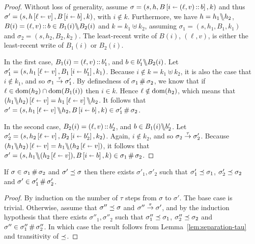 \documentclass[11pt]{report}
\begin{document}
\begin{proof}
	Without loss of generality, assume $\sigma = (s,h,B \left[ i \shortleftarrow (\ell,v)\operatorname{:\!:} b \right],k)$ and thus $\sigma' = (s,h \left[ \ell \shortleftarrow v \right],B \left[ i \shortleftarrow b \right],k)$, with $i \notin k$. Furthermore, we have $h = h_1 \backslash\!\!\backslash h_2$, $B(i) = (\ell,v) \operatorname{:\!:} b \in B_1(i) \backslash\!\!\backslash B_2(i)$ and $k = k_1 \uplus k_2$, assuming $\sigma_1 = (s,h_1,B_1,k_1)$ and $\sigma_2 = (s,h_2,B_2,k_2)$. The least-recent write of $B(i)$, $(\ell,v)$, is either the least-recent write of $B_1(i)$ or $B_2(i)$. 

	In the first case, $B_1(i) = (\ell,v) \operatorname{:\!:} b_1'$, and $b \in b'_1 \backslash\!\!\backslash B_2(i)$. Let $\sigma'_1 = (s,h_1 \left[ \ell \shortleftarrow v \right],B_1 \left[ i \shortleftarrow b'_1 \right],k_1)$. Because $i \notin k = k_1 \uplus k_2$, it is also the case that $i \notin k_1$, and so $\sigma_1 \stackrel{\tau}{\rightarrow} \sigma'_1$. By definedness of $\sigma_1 \operatorname{\#} \sigma_2$, we know that if $\ell \in \operatorname{\mathrm{dom}}(h_2) \cap \operatorname{\mathrm{dom}}(B_1(i))$ then $i \in k$. Hence $\ell \notin \operatorname{\mathrm{dom}}(h_2)$, which means that $(h_1 \backslash\!\!\backslash h_2) \left[ \ell \shortleftarrow v \right] = h_1 \left[ \ell \shortleftarrow v \right] \backslash\!\!\backslash h_2$. It follows that $\sigma' = (s,h_1 \left[ \ell \shortleftarrow v \right] \backslash\!\!\backslash h_2, B \left[ i \shortleftarrow b \right],k) \in \sigma'_1 \operatorname{\#} \sigma_2$. 

	In the second case, $B_2(i) = (\ell,v) \operatorname{:\!:} b'_2$, and $b \in B_1(i) \backslash\!\!\backslash b'_2$. Let $\sigma'_2 = (s,h_2 \left[ \ell \shortleftarrow v \right],B_2 \left[ i \shortleftarrow b'_2 \right],k_2)$. Again, $i \notin k_2$, and so $\sigma_2 \stackrel{\tau}{\rightarrow} \sigma'_2$. Because $(h_1 \backslash\!\!\backslash h_2) \left[ \ell \shortleftarrow v \right] = h_1 \backslash\!\!\backslash (h_2 \left[ \ell \shortleftarrow v \right])$, it follows that $\sigma' = (s,h_1 \backslash\!\!\backslash (h_2 \left[ \ell \shortleftarrow v \right]),B \left[ i \shortleftarrow b \right],k) \in \sigma_1 \operatorname{\#} \sigma_2$. 
\end{proof}

\begin{lemma}
	\label{lem:separation-refinement}
	If $\sigma \in \sigma_1 \operatorname{\#} \sigma_2$ and $\sigma' \preceq \sigma$ then there exists $\sigma'_1,\sigma'_2$ such that $\sigma'_1 \preceq \sigma_1$, $\sigma'_2 \preceq \sigma_2$ and $\sigma' \in \sigma'_1 \operatorname{\#} \sigma'_2$. 
\end{lemma}

\begin{proof}
	By induction on the number of $\tau$ steps from $\sigma$ to $\sigma'$. The base case is trivial. Otherwise, assume that $\sigma'' \preceq \sigma$ and $\sigma'' \stackrel{\tau}{\rightarrow} \sigma'$, and by the induction hypothesis that there exists $\sigma''_1,\sigma''_2$ such that $\sigma''_1 \preceq \sigma_1$, $\sigma''_2 \preceq \sigma_2$ and $\sigma'' \in \sigma''_1 \operatorname{\#} \sigma''_2$. In which case the result follows from Lemma~\ref{lem:separation-tau} and transitivity of $\preceq$.
\end{proof}
\end{document}
